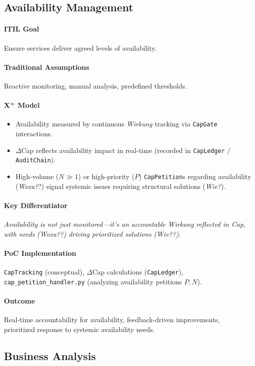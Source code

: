 \documentclass[12pt, a4paper]{scrartcl}
\newcommand{\Xinf}{X$^\infty$}                        %
\newcommand{\DeltaCap}{$\Delta$Cap}                    %
\newcommand{\CapLedger}{\texttt{CapLedger}}          %
\newcommand{\Wirkung}{\textit{Wirkung}}                 %
\newcommand{\CapGate}{\texttt{CapGate}}
\newcommand{\AuditChain}{\texttt{AuditChain}}
\newcommand{\CapPetition}{\texttt{CapPetition}}        %
\newcommand{\Wozu}{\textit{Wozu?}}                      %
\newcommand{\Wie}{\textit{Wie?}}                        %
\begin{document}
\subsection{Availability Management} %
\paragraph{ITIL Goal} Ensure services deliver agreed levels of availability.
\paragraph{Traditional Assumptions} Reactive monitoring, manual analysis, predefined thresholds.
\paragraph*{\Xinf{} Model}
\begin{itemize}
    \item Availability measured by continuous \Wirkung{} tracking via \CapGate{} interactions.
    \item \DeltaCap{} reflects availability impact in real-time (recorded in \CapLedger{} / \AuditChain{}).
    \item High-volume ($N \gg 1$) or high-priority ($P$) \CapPetition{}s regarding availability (\Wozu?) signal systemic issues requiring structural solutions (\Wie{}).
\end{itemize}
\paragraph{Key Differentiator} \textit{Availability is not just monitored—it's an accountable \Wirkung{} reflected in Cap, with needs (\Wozu?) driving prioritized solutions (\Wie?).}
\paragraph{PoC Implementation} \texttt{CapTracking} (conceptual), \DeltaCap{} calculations (\CapLedger{}), \texttt{cap\_petition\_handler.py} (analyzing availability petitions $P,N$).
\paragraph{Outcome} Real-time accountability for availability, feedback-driven improvements, prioritized response to systemic availability needs.

\subsection{Business Analysis} %
\end{document}
